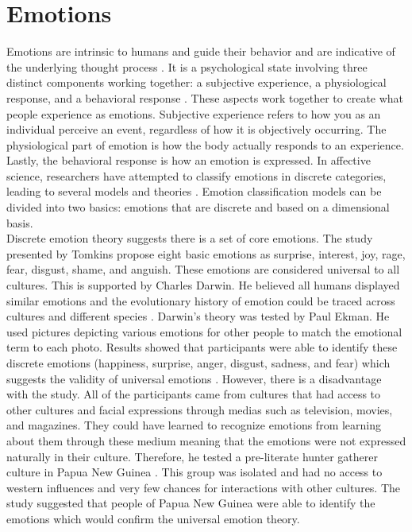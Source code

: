 \section{Emotions}
\label{sec:emotions}
Emotions are intrinsic to humans and guide their behavior and are indicative of the underlying thought process \cite{emotions1-minsky2007emotion}. It is a psychological state involving three distinct components working together: a subjective experience, a physiological response, and a behavioral response \cite{emotions2-LEDOUX201867}. These aspects work together to create what people experience as emotions. Subjective experience refers to how you as an individual perceive an event, regardless of how it is objectively occurring. The physiological part of emotion is how the body actually responds to an experience. Lastly, the behavioral response is how an emotion is expressed. In affective science, researchers have attempted to classify emotions in discrete categories, leading to several models and theories \cite{cross_cultural}. Emotion classification models can be divided into two basics: emotions that are discrete and based on a dimensional basis. \\

Discrete emotion theory suggests there is a set of core emotions. The study presented by Tomkins \cite{emotions3-tomkins1962affect} propose eight basic emotions as surprise, interest, joy, rage, fear, disgust, shame, and anguish. These emotions are considered universal to all cultures. This is supported by Charles Darwin. He believed all humans displayed similar emotions and the evolutionary history of emotion could be traced across cultures and different species \cite{emotions4-darwin1998expression}. Darwin's theory was tested by Paul Ekman. He used pictures depicting various emotions for other people to match the emotional term to each photo. Results showed that participants were able to identify these discrete emotions (happiness, surprise, anger, disgust, sadness, and fear) which suggests the validity of universal emotions \cite{emotions5-ekman1999basic}. However, there is a disadvantage with the study. All of the participants came from cultures that had access to other cultures and facial expressions through medias such as television, movies, and magazines. They could have learned to recognize emotions from learning about them through these medium meaning that the emotions were not expressed naturally in their culture. Therefore, he tested a pre-literate hunter gatherer culture in Papua New Guinea \cite{emotions6-ekman1993facial}. This group was isolated and had no access to western influences and very few chances for interactions with other cultures. The study suggested that people of Papua New Guinea were able to identify the emotions which would confirm the universal emotion theory. \\

